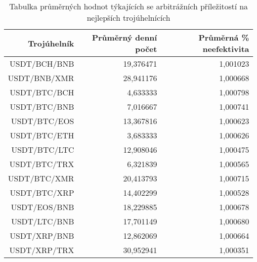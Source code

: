 \begin{table}\centering
\caption{Tabulka průměrných hodnot týkajících se arbitrážních příležitostí na nejlepších trojúhelnících}
\label{table_averages_best}
\begin{tabular}{|| r | r | r ||}\hline Trojúhelník & Průměrný denní počet & Průměrná \% neefektivita\\ [0.5ex]
 \hline\hline USDT/BCH/BNB & 19,376471 & 1,001023\\ 
 \hline USDT/BNB/XMR & 28,941176 & 1,000668\\ 
 \hline USDT/BTC/BCH & 4,633333 & 1,000798\\ 
 \hline USDT/BTC/BNB & 7,016667 & 1,000741\\ 
 \hline USDT/BTC/EOS & 13,367816 & 1,000623\\ 
 \hline USDT/BTC/ETH & 3,683333 & 1,000626\\ 
 \hline USDT/BTC/LTC & 12,908046 & 1,000475\\ 
 \hline USDT/BTC/TRX & 6,321839 & 1,000565\\ 
 \hline USDT/BTC/XMR & 20,413793 & 1,000715\\ 
 \hline USDT/BTC/XRP & 14,402299 & 1,000528\\ 
 \hline USDT/EOS/BNB & 18,229885 & 1,000678\\ 
 \hline USDT/LTC/BNB & 17,701149 & 1,000680\\ 
 \hline USDT/XRP/BNB & 12,862069 & 1,000664\\ 
 \hline USDT/XRP/TRX & 30,952941 & 1,000351\\ 
 \hline
\end{tabular}
\end{table}